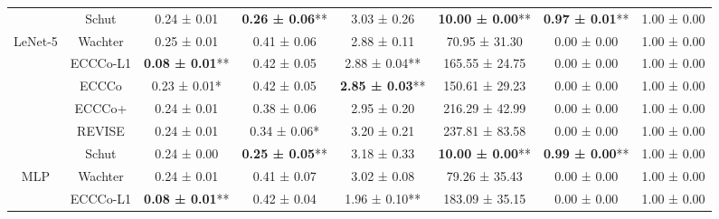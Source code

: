\begin{table}
{\begin{tabular}[t]{cccccccc}
 & Schut & 0.24 ± 0.01\hphantom{*}\hphantom{*} & \textbf{0.26 ± 0.06}** & 3.03 ± 0.26\hphantom{*}\hphantom{*} & \textbf{10.00 ± 0.00}** & \textbf{0.97 ± 0.01}** & 1.00 ± 0.00\hphantom{*}\hphantom{*}\\

\multirow[t]{-6}{*}{\centering\arraybackslash LeNet-5} & Wachter & 0.25 ± 0.01\hphantom{*}\hphantom{*} & 0.41 ± 0.06\hphantom{*}\hphantom{*} & 2.88 ± 0.11\hphantom{*}\hphantom{*} & 70.95 ± 31.30\hphantom{*}\hphantom{*} & 0.00 ± 0.00\hphantom{*}\hphantom{*} & 1.00 ± 0.00\hphantom{*}\hphantom{*}\\
\cmidrule{1-8}
 & ECCCo-L1 & \textbf{0.08 ± 0.01}** & 0.42 ± 0.05\hphantom{*}\hphantom{*} & 2.88 ± 0.04** & 165.55 ± 24.75\hphantom{*}\hphantom{*} & 0.00 ± 0.00\hphantom{*}\hphantom{*} & 1.00 ± 0.00\hphantom{*}\hphantom{*}\\

 & ECCCo & 0.23 ± 0.01*\hphantom{*} & 0.42 ± 0.05\hphantom{*}\hphantom{*} & \textbf{2.85 ± 0.03}** & 150.61 ± 29.23\hphantom{*}\hphantom{*} & 0.00 ± 0.00\hphantom{*}\hphantom{*} & 1.00 ± 0.00\hphantom{*}\hphantom{*}\\

 & ECCCo+ & 0.24 ± 0.01\hphantom{*}\hphantom{*} & 0.38 ± 0.06\hphantom{*}\hphantom{*} & 2.95 ± 0.20\hphantom{*}\hphantom{*} & 216.29 ± 42.99\hphantom{*}\hphantom{*} & 0.00 ± 0.00\hphantom{*}\hphantom{*} & 1.00 ± 0.00\hphantom{*}\hphantom{*}\\

 & REVISE & 0.24 ± 0.01\hphantom{*}\hphantom{*} & 0.34 ± 0.06*\hphantom{*} & 3.20 ± 0.21\hphantom{*}\hphantom{*} & 237.81 ± 83.58\hphantom{*}\hphantom{*} & 0.00 ± 0.00\hphantom{*}\hphantom{*} & 1.00 ± 0.00\hphantom{*}\hphantom{*}\\

 & Schut & 0.24 ± 0.00\hphantom{*}\hphantom{*} & \textbf{0.25 ± 0.05}** & 3.18 ± 0.33\hphantom{*}\hphantom{*} & \textbf{10.00 ± 0.00}** & \textbf{0.99 ± 0.00}** & 1.00 ± 0.00\hphantom{*}\hphantom{*}\\

\multirow[t]{-6}{*}{\centering\arraybackslash MLP} & Wachter & 0.24 ± 0.01\hphantom{*}\hphantom{*} & 0.41 ± 0.07\hphantom{*}\hphantom{*} & 3.02 ± 0.08\hphantom{*}\hphantom{*} & 79.26 ± 35.43\hphantom{*}\hphantom{*} & 0.00 ± 0.00\hphantom{*}\hphantom{*} & 1.00 ± 0.00\hphantom{*}\hphantom{*}\\
\cmidrule{1-8}
 & ECCCo-L1 & \textbf{0.08 ± 0.01}** & 0.42 ± 0.04\hphantom{*}\hphantom{*} & 1.96 ± 0.10** & 183.09 ± 35.15\hphantom{*}\hphantom{*} & 0.00 ± 0.00\hphantom{*}\hphantom{*} & 1.00 ± 0.00\hphantom{*}\hphantom{*}\\


\end{tabular}}
\end{table}

